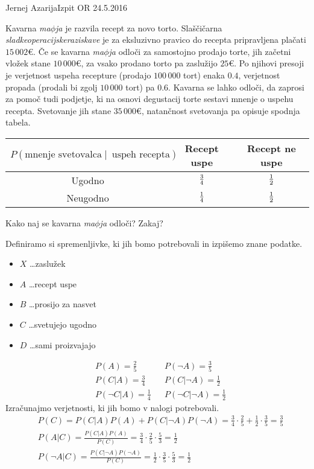 \begin{naloga}{Jernej Azarija}{Izpit OR 24.5.2016}
\begin{vprasanje}
Kavarna {\em ma$\phi$ja} je razvila recept za novo torto.
Slaščičarna {\em sladkeoperacijskeraziskave}
je za eksluzivno pravico do recepta pripravljena plačati $15\,002 €$.
Če se kavarna {\em ma$\phi$ja} odloči za samostojno prodajo torte,
jih začetni vložek stane $10\,000 €$,
za vsako prodano torto pa zaslužijo $25 €$.
Po njihovi presoji
je verjetnost uspeha recepture (prodajo $100\,000$ tort) enaka $0.4$,
verjetnost propada (prodali bi zgolj $10\,000$ tort) pa $0.6$.
Kavarna se lahko odloči, da zaprosi za pomoč tudi pod\-jet\-je,
ki na osnovi degustacij torte sestavi mnenje o uspehu recepta.
Svetovanje jih stane $35\,000 €$,
natančnost svetovanja pa opisuje spodnja tabela.
\begin{center}
\begin{tabular}{c|cc}
$P(\text{mnenje svetovalca} \;|\;\ \text{uspeh recepta})$
& Recept uspe & Recept ne uspe \\ \hline
Ugodno   & ${3 \over 4}$ & ${1 \over 2}$ \\
Neugodno & ${1 \over 4}$ & ${1 \over 2}$
\end{tabular}
\end{center}
Kako naj se kavarna {\em ma$\phi$ja} odloči?
Zakaj?
\end{vprasanje}
\begin{odgovor}

Definiramo si spremenljivke, ki jih bomo potrebovali in izpišemo znane podatke.
\begin{itemize}
\item[] $X$ \dots zaslužek
\item[] $A$ \dots recept uspe
\item[] $B$ \dots prosijo za nasvet
\item[] $C$ \dots svetujejo ugodno
\item[] $D$ \dots sami proizvajajo
\end{itemize}
\begin{align*}
&P(A) = \frac{2}{5} && P(\neg A) = \frac{3}{5}\\
&P(C|A) = \frac{3}{4} & &P(C|\neg A) = \frac{1}{2}\\
&P(\neg C|A) = \frac{1}{4} & &P(\neg C| \neg A) = \frac{1}{2}
\end{align*}
Izračunajmo verjetnosti, ki jih bomo v nalogi potrebovali.
\begin{align*}
&P(C) = P(C|A) P(A) + P(C|\neg A) P(\neg A) =\frac{3}{4}\cdot \frac{2}{5} + \frac{1}{2}\cdot \frac{3}{5} = \frac{3}{5}\\
&P(A|C) = \frac{P(C|A)P(A)}{P(C)} = \frac{3}{4}\cdot \frac{2}{5}\cdot \frac{5}{3}=\frac{1}{2}\\
&P(\neg A|C) = \frac{P(C|\neg A)P(\neg A)}{P(C)} = \frac{1}{2}\cdot \frac{3}{5}\cdot \frac{5}{3} = \frac{1}{2}
\end{align*}


\end{odgovor}
\end{naloga}
